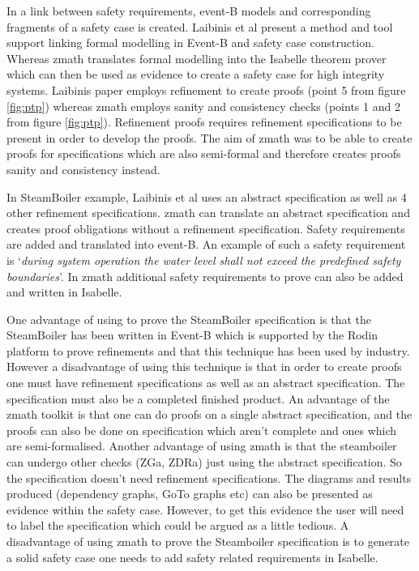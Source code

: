 In \cite{laibinis} a link between safety requirements, event-B models and corresponding fragments of
a safety case is created. Laibinis et al present a method and tool support linking formal modelling in
Event-B and safety case construction. Whereas \gls{zmath} translates formal modelling into the Isabelle 
theorem prover which can then be used as evidence to create a safety case for high integrity systems.
Laibinis paper employs refinement to create proofs (point 5 from figure \ref{fig:ptp}) whereas \gls{zmath}
employs sanity and consistency checks (points 1 and 2 from figure \ref{fig:ptp}). Refinement proofs requires
refinement specifications to be present in order to develop the proofs. The aim of \gls{zmath} was to be able
to create proofs for specifications which are also semi-formal and therefore creates proofs sanity and consistency
instead.

In \cite{laibinis} SteamBoiler example, Laibinis et al uses an abstract specification as well as 
4 other refinement specifications. \Gls{zmath} can translate an abstract specification and creates 
proof obligations without a refinement specification. Safety requirements are added and translated 
into event-B. An example of such a safety requirement is `\textit{during system operation the water level shall not exceed the
predefined safety boundaries}'. In \gls{zmath} additional safety requirements to prove can also be added
and written in Isabelle.

One advantage of using \cite{laibinis} to prove the SteamBoiler specification is that the SteamBoiler
has been written in Event-B which is supported by the Rodin platform to prove refinements and
 that this technique has been used by industry.
 However a disadvantage of using this technique is that in order to create proofs one must have refinement
 specifications as well as an abstract specification. The specification must also be a completed finished product.
 An advantage of the \gls{zmath} toolkit is that one can do proofs on a single abstract specification, and the 
 proofs can also be done on specification which aren't complete and ones which are semi-formalised.
 Another advantage of using \gls{zmath} is that the steamboiler can undergo other checks (ZGa, ZDRa) just
 using the abstract specification. So the specification doesn't need refinement specifications. The diagrams
 and results produced (dependency graphs, GoTo graphs etc) can also be presented as evidence within the safety case.
 However, to get this evidence the user will need to label the specification which could be argued as a little tedious.
 A disadvantage of using \gls{zmath} to prove the Steamboiler specification is to generate a solid safety case
 one needs to add safety related requirements in Isabelle.

